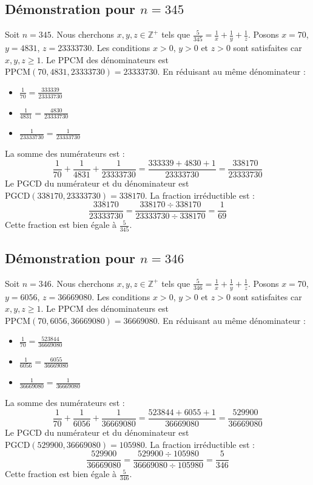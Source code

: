 \documentclass[11pt,a4paper]{article}
\begin{document}
\subsection{Démonstration pour $n = 345$}
Soit $n = 345$. Nous cherchons $x, y, z \in \mathbb{Z}^{+}$ tels que $\frac{5}{345} = \frac{1}{x} + \frac{1}{y} + \frac{1}{z}$.
Posons $x = 70$, $y = 4831$, $z = 23333730$.
Les conditions $x > 0$, $y > 0$ et $z > 0$ sont satisfaites car $x, y, z \geq 1$.
Le PPCM des dénominateurs est $\text{PPCM}(70, 4831, 23333730) = 23333730$.
En réduisant au même dénominateur :
\begin{itemize}
    \item $\frac{1}{70} = \frac{333339}{23333730}$
    \item $\frac{1}{4831} = \frac{4830}{23333730}$
    \item $\frac{1}{23333730} = \frac{1}{23333730}$
\end{itemize}
La somme des numérateurs est :
$$ \frac{1}{70} + \frac{1}{4831} + \frac{1}{23333730} = \frac{333339 + 4830 + 1}{23333730} = \frac{338170}{23333730} $$
Le PGCD du numérateur et du dénominateur est $\text{PGCD}(338170, 23333730) = 338170$.
La fraction irréductible est :
$$ \frac{338170}{23333730} = \frac{338170 \div 338170}{23333730 \div 338170} = \frac{1}{69} $$
Cette fraction est bien égale à $\frac{5}{345}$.

\subsection{Démonstration pour $n = 346$}
Soit $n = 346$. Nous cherchons $x, y, z \in \mathbb{Z}^{+}$ tels que $\frac{5}{346} = \frac{1}{x} + \frac{1}{y} + \frac{1}{z}$.
Posons $x = 70$, $y = 6056$, $z = 36669080$.
Les conditions $x > 0$, $y > 0$ et $z > 0$ sont satisfaites car $x, y, z \geq 1$.
Le PPCM des dénominateurs est $\text{PPCM}(70, 6056, 36669080) = 36669080$.
En réduisant au même dénominateur :
\begin{itemize}
    \item $\frac{1}{70} = \frac{523844}{36669080}$
    \item $\frac{1}{6056} = \frac{6055}{36669080}$
    \item $\frac{1}{36669080} = \frac{1}{36669080}$
\end{itemize}
La somme des numérateurs est :
$$ \frac{1}{70} + \frac{1}{6056} + \frac{1}{36669080} = \frac{523844 + 6055 + 1}{36669080} = \frac{529900}{36669080} $$
Le PGCD du numérateur et du dénominateur est $\text{PGCD}(529900, 36669080) = 105980$.
La fraction irréductible est :
$$ \frac{529900}{36669080} = \frac{529900 \div 105980}{36669080 \div 105980} = \frac{5}{346} $$
Cette fraction est bien égale à $\frac{5}{346}$.
\end{document}
